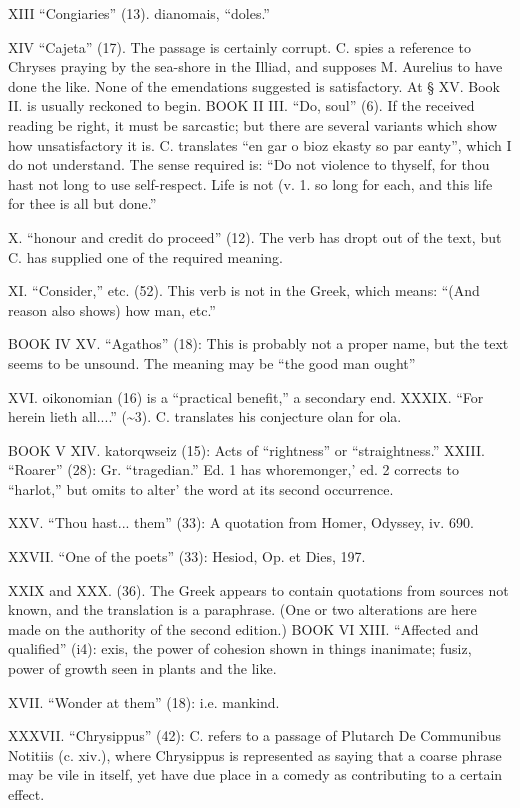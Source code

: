 XIII ``Congiaries'' (13). dianomais, ``doles.''

XIV ``Cajeta'' (17). The passage is certainly corrupt. C. spies a reference
to Chryses praying by the sea-shore in the Illiad, and supposes M.
Aurelius to have done the like. None of the emendations suggested is
satisfactory. At § XV. Book II. is usually reckoned to begin. BOOK II III.
``Do, soul'' (6). If the received reading be right, it must be sarcastic;
but there are several variants which show how unsatisfactory it is. C.
translates ``en gar o bioz ekasty so par eanty'', which I do not understand.
The sense required is: ``Do not violence to thyself, for thou hast not long
to use self-respect. Life is not (v. 1. so long for each, and this life
for thee is all but done.''

X. ``honour and credit do proceed'' (12). The verb has dropt out of the
text, but C. has supplied one of the required meaning.

XI. ``Consider,'' etc. (52). This verb is not in the Greek, which means:
``(And reason also shows) how man, etc.''

BOOK IV XV. ``Agathos'' (18): This is probably not a proper name, but the
text seems to be unsound. The meaning may be ``the good man ought''

XVI. oikonomian (16) is a ``practical benefit,'' a secondary end. XXXIX.
``For herein lieth all....'' (\textasciitilde{}3). C. translates his conjecture olan for
ola.

BOOK V XIV. katorqwseiz (15): Acts of ``rightness'' or ``straightness.''
XXIII. ``Roarer'' (28): Gr. ``tragedian.'' Ed. 1 has whoremonger,' ed. 2
corrects to ``harlot,'' but omits to alter' the word at its second
occurrence.

XXV. ``Thou hast... them'' (33): A quotation from Homer, Odyssey, iv. 690.

XXVII. ``One of the poets'' (33): Hesiod, Op. et Dies, 197.

XXIX and XXX. (36). The Greek appears to contain quotations from sources
not known, and the translation is a paraphrase. (One or two alterations
are here made on the authority of the second edition.) BOOK VI XIII.
``Affected and qualified'' (i4): exis, the power of cohesion shown in things
inanimate; fusiz, power of growth seen in plants and the like.

XVII. ``Wonder at them'' (18): i.e. mankind.

XXXVII. ``Chrysippus'' (42): C. refers to a passage of Plutarch De
Communibus Notitiis (c. xiv.), where Chrysippus is represented as saying
that a coarse phrase may be vile in itself, yet have due place in a comedy
as contributing to a certain effect.

